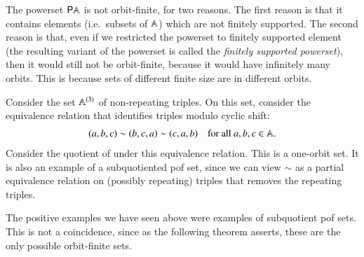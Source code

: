 \begin{myexample}\label{ex:powerset-not-orbit-finite}
    The powerset ${\mathsf P} \mathbb A$ is not orbit-finite, for two reasons. The first reason is that it contains elements (i.e.~subsets of $\mathbb A$) which are not finitely supported. The second reason is that, even if we restricted the powerset to finitely supported element (the resulting variant of the powerset is called the \emph{finitely supported powerset}), then it would still not be orbit-finite, because it would have infinitely many orbits. This is because sets of different finite size are in different orbits. 
\end{myexample}

\begin{myexample}\label{ex:cyclic-triples}
    Consider the set $\mathbb A^{(3)}$ of non-repeating triples. On this set, consider the equivalence relation that identifies triples modulo cyclic shift: 
    \begin{align*}
    (a,b,c) \sim (b,c,a) \sim (c,a,b) \quad \text{for all $a,b,c \in \mathbb A$}.
    \end{align*}
    Consider the quotient of under this equivalence relation. This is a one-orbit set. It is also an example of a subquotiented pof set, since we can view $\sim$ as a partial equivalence relation on (possibly repeating) triples that removes the repeating triples. 
\end{myexample}




The positive examples we have seen above were examples of subquotient pof sets. This is not a coincidence, since as the following theorem asserts, these are the only possible orbit-finite sets.

